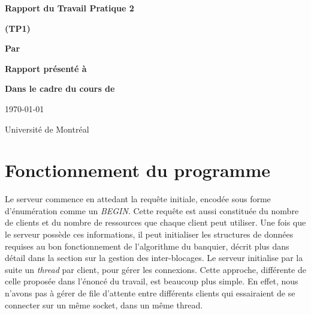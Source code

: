 \documentclass[letterpaper,12pt]{scrartcl}
\begin{document}
	\begin{center}
		\vspace{2cm}

		{\Huge\bf\sf Rapport du Travail Pratique 2}

		\vspace{0.5cm}

		{\bf\sf (TP1)}

		\vspace{4cm}

		{\bf\sf Par}

		\vspace{0.5cm}{\large\bf\sf Charles Langlois et François Poitras}

		\vspace{2cm}

		{\bf\sf Rapport présenté à}

		\vspace{0.5cm}{\large\bf\sf M. Stefan Monnier}

		\vspace{2cm}

		{\bf\sf Dans le cadre du cours de}

		\vspace{0.5cm}{\large\bf\sf Systèmes d'exploitation (IFT2245)}

		\vspace{\fill}
		\today

		\vspace{0.5cm}Université de Montréal
	\end{center}
	
	\newpage

	\pagestyle{cb}
	
	\tableofcontents

	\newpage
\section{Fonctionnement du programme}
Le serveur commence en attedant la requête initiale, encodée sous forme d'énumération comme un \textit{BEGIN}. Cette requête est aussi constituée du nombre de clients et du nombre de ressources que chaque client peut utiliser. Une fois que le serveur possède ces informations, il peut initialiser les structures de données requises au bon fonctionnement de l'algorithme du banquier, décrit plus dans détail dans la section sur la gestion des inter-blocages. Le serveur initialise par la suite un \textit{thread} par client, pour gérer les connexions. Cette approche, différente de celle proposée dans l'énoncé du travail, est beaucoup plus simple. En effet, nous n'avons pas à gérer de file d'attente entre différents clients qui essairaient de se connecter sur un même socket, dans un même thread.
\end{document}
